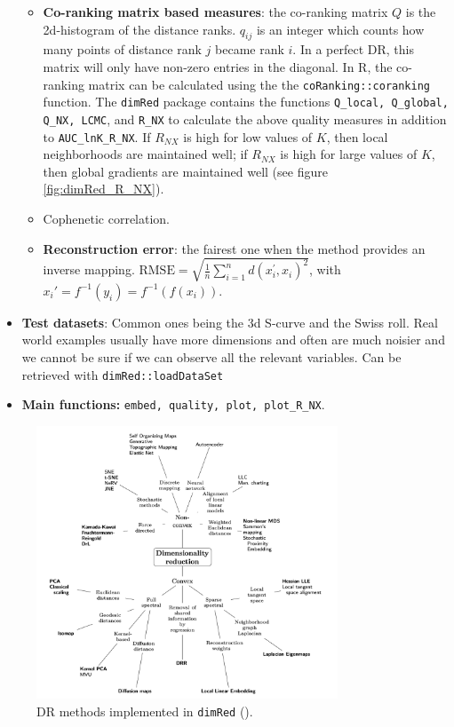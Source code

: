 \documentclass[a4paper,12pt]{article}
\begin{document}
\begin{itemize}
        \begin{itemize}
            \item \textbf{Co-ranking matrix based measures}: the co-ranking matrix $Q$ is the 2d-histogram of the distance ranks. $q_{ij}$ is an integer which counts how many points of distance rank $j$ became rank $i$. In a perfect DR, this matrix will only have non-zero entries in the
            diagonal. In R, the co-ranking matrix can be calculated using the the \texttt{coRanking::coranking} function. The \texttt{dimRed} package contains the functions \texttt{Q\_local, Q\_global, Q\_NX, LCMC}, and \texttt{R\_NX} to calculate the above quality measures in addition to \texttt{AUC\_lnK\_R\_NX}. If $R_{NX}$ is high for low values of $K$, then local neighborhoods are maintained well; if $R_{NX}$ is high for large values of $K$, then global gradients are maintained well (see figure \ref{fig:dimRed_R_NX}).
            \item Cophenetic correlation.
            \item \textbf{Reconstruction error}: the fairest one when the method provides an inverse mapping. $\mathrm{RMSE}=\sqrt{\frac{1}{n} \sum_{i=1}^n d\left(x_i^{\prime}, x_i\right)^2}$, with $x_i' = f^{-1}(y_i) = f^{-1}(f(x_i))$.
        \end{itemize}
    \item \textbf{Test datasets}: Common ones being the 3d S-curve and the Swiss roll. Real world examples usually have more dimensions and often are much noisier and we cannot be sure if we can observe all the relevant variables. Can be retrieved with \texttt{dimRed::loadDataSet}
    \item \textbf{Main functions:} \texttt{embed, quality, plot, plot\_R\_NX}.
\end{itemize}

\begin{figure}[ht]
    \centering
    \includegraphics[width=0.8\textwidth]{figures/dimRed_methods.png}
    \caption{DR methods implemented in \texttt{dimRed} (\cite{Kraemer2018}).}
    \label{fig:dimRed_methods}
\end{figure}
\end{document}
